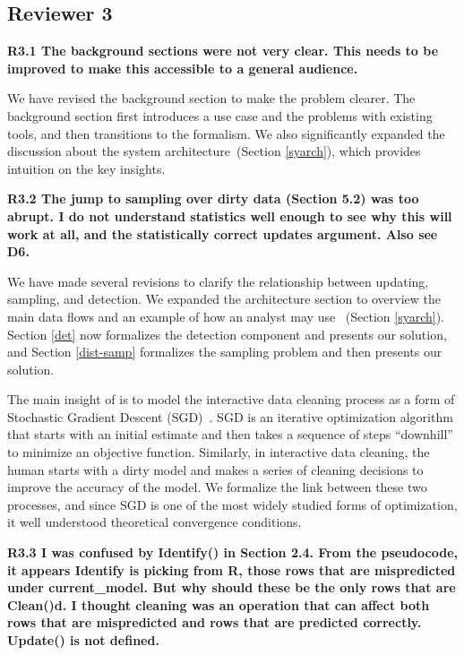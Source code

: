  \subsection*{Reviewer 3}

\noindent\textbf{R3.1 The background sections were not very clear. This needs to be improved
to make this accessible to a general audience.}

\noindent  We have revised the background section to make the problem clearer. The background section first introduces a use case and the problems with existing tools, and then transitions to the formalism. We also significantly expanded the discussion about the system architecture~(Section \ref{syarch}), which provides intuition on the key insights.

\vspace{0.5em}

\noindent\textbf{R3.2 The jump to sampling over dirty data (Section 5.2) was too abrupt.
I do not understand statistics well enough to see why this will work at all,
and the statistically correct updates argument. Also see D6.}

\noindent  We have made several revisions to clarify the relationship between updating, sampling, and detection. We expanded the architecture section to overview the main data flows and an example of how an analyst may use \sys~(Section \ref{syarch}). Section \ref{det} now formalizes the detection component and presents our solution, and Section \ref{dist-samp} formalizes the sampling problem and then presents our solution.

The main insight of \sys is to model the interactive data cleaning process as a form of Stochastic Gradient Descent (SGD)~\cite{bottou2012stochastic}.
SGD is an iterative optimization algorithm that starts with an initial estimate and then takes a sequence of steps ``downhill'' to minimize an objective function.
Similarly, in interactive data cleaning, the human starts with a dirty model and makes a series of cleaning decisions to improve the accuracy of the model.
We formalize the link between these two processes, and since SGD is one of the most widely studied forms of optimization, it well understood theoretical convergence conditions.


\vspace{0.5em}

\noindent \textbf{R3.3 I was confused by Identify() in Section 2.4.
From the pseudocode, it appears Identify is picking from R,
those rows that are mispredicted under current\_model.
But why should these be the only rows that are Clean()d.
I thought cleaning was an operation that can
affect both rows that are mispredicted and rows that
are predicted correctly. Update() is not defined.}

